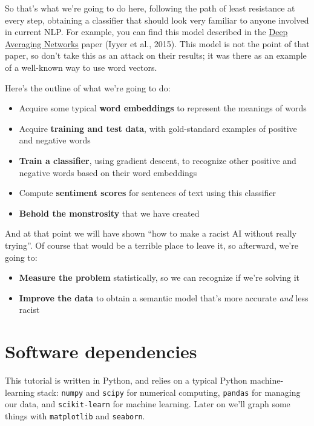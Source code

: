 \documentclass[]{book}
\providecommand{\tightlist}{%
  \setlength{\itemsep}{0pt}\setlength{\parskip}{0pt}}
\theoremstyle{definition}
\theoremstyle{definition}
\theoremstyle{definition}
\theoremstyle{remark}
\begin{document}
So that's what we're going to do here, following the path of least
resistance at every step, obtaining a classifier that should look very
familiar to anyone involved in current NLP. For example, you can find
this model described in the
\href{http://cs.umd.edu/~miyyer/pubs/2015_acl_dan.pdf}{Deep Averaging
Networks} paper (Iyyer et al., 2015). This model is not the point of
that paper, so don't take this as an attack on their results; it was
there as an example of a well-known way to use word vectors.

Here's the outline of what we're going to do:

\begin{itemize}
\tightlist
\item
  Acquire some typical \textbf{word embeddings} to represent the
  meanings of words
\item
  Acquire \textbf{training and test data}, with gold-standard examples
  of positive and negative words
\item
  \textbf{Train a classifier}, using gradient descent, to recognize
  other positive and negative words based on their word embeddings
\item
  Compute \textbf{sentiment scores} for sentences of text using this
  classifier
\item
  \textbf{Behold the monstrosity} that we have created
\end{itemize}

And at that point we will have shown ``how to make a racist AI without
really trying''. Of course that would be a terrible place to leave it,
so afterward, we're going to:

\begin{itemize}
\tightlist
\item
  \textbf{Measure the problem} statistically, so we can recognize if
  we're solving it
\item
  \textbf{Improve the data} to obtain a semantic model that's more
  accurate \emph{and} less racist
\end{itemize}

\section{Software dependencies}\label{software-dependencies}

This tutorial is written in Python, and relies on a typical Python
machine-learning stack: \texttt{numpy} and \texttt{scipy} for numerical
computing, \texttt{pandas} for managing our data, and
\texttt{scikit-learn} for machine learning. Later on we'll graph some
things with \texttt{matplotlib} and \texttt{seaborn}.
\end{document}
